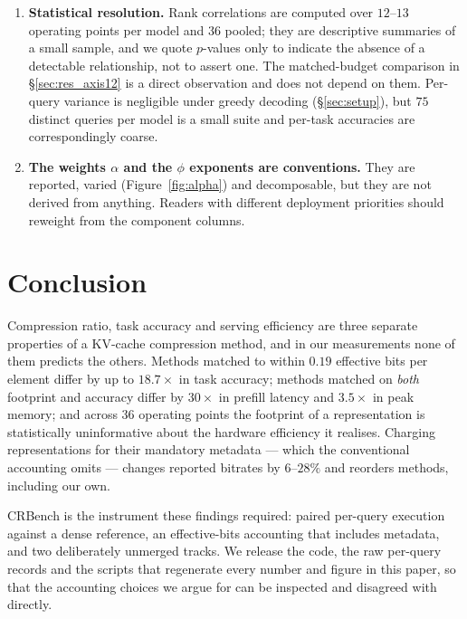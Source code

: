 \documentclass{article}
\theoremstyle{definition}
\begin{document}
\begin{enumerate}[leftmargin=*,itemsep=2.5pt,topsep=3pt]
    \item \textbf{Statistical resolution.} Rank correlations are computed over $12$--$13$ operating points per model and $36$ pooled; they are descriptive summaries of a small sample, and we quote $p$-values only to indicate the absence of a detectable relationship, not to assert one. The matched-budget comparison in \S\ref{sec:res_axis12} is a direct observation and does not depend on them. Per-query variance is negligible under greedy decoding (\S\ref{sec:setup}), but $75$ distinct queries per model is a small suite and per-task accuracies are correspondingly coarse.
    \item \textbf{The weights $\alpha$ and the $\phi$ exponents are conventions.} They are reported, varied (Figure~\ref{fig:alpha}) and decomposable, but they are not derived from anything. Readers with different deployment priorities should reweight from the component columns.
\end{enumerate}

\section{Conclusion}
\label{sec:conclusion}

Compression ratio, task accuracy and serving efficiency are three separate properties of a KV-cache compression method, and in our measurements none of them predicts the others. Methods matched to within $0.19$ effective bits per element differ by up to $18.7\times$ in task accuracy; methods matched on \emph{both} footprint and accuracy differ by $30\times$ in prefill latency and $3.5\times$ in peak memory; and across $36$ operating points the footprint of a representation is statistically uninformative about the hardware efficiency it realises. Charging representations for their mandatory metadata --- which the conventional accounting omits --- changes reported bitrates by $6$--$28\%$ and reorders methods, including our own.

CRBench is the instrument these findings required: paired per-query execution against a dense reference, an effective-bits accounting that includes metadata, and two deliberately unmerged tracks. We release the code, the raw per-query records and the scripts that regenerate every number and figure in this paper, so that the accounting choices we argue for can be inspected and disagreed with directly.

\end{document}

